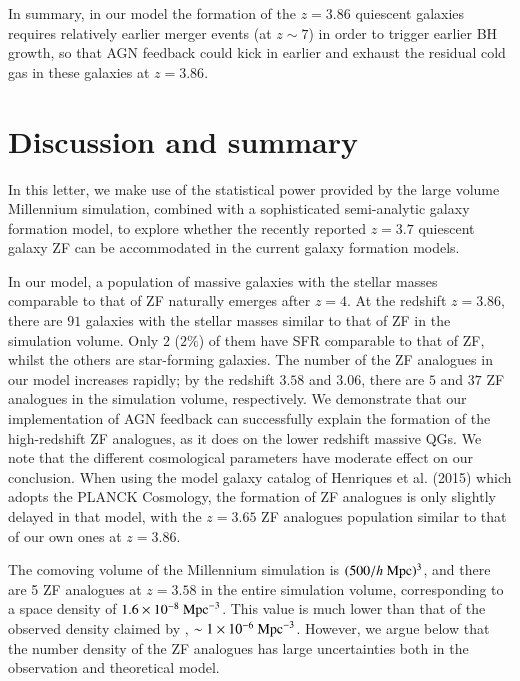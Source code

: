 \documentclass[useAMS,usenatbib]{mn2e}
\begin{document}
In summary, in our model the formation of the $z=3.86$ quiescent galaxies requires relatively earlier merger events (at $z\sim 7$) in order to trigger earlier BH growth, so that AGN feedback could kick in earlier and exhaust the residual cold gas in these galaxies at $z = 3.86$.

\section{Discussion and summary}

In this letter, we make use of the statistical power provided by the large volume Millennium simulation, combined with a sophisticated semi-analytic galaxy formation model, to explore whether the recently reported $z=3.7$ quiescent galaxy ZF can be accommodated in the current galaxy formation models. 

In our model, a population of massive galaxies with the stellar masses comparable to that of ZF naturally emerges after $z=4$. At the redshift $z=3.86$, there are $91$ galaxies with the stellar masses similar to that of ZF in the simulation volume. Only $2$ ($2\%$) of them have SFR comparable to that of ZF, whilst the others are star-forming galaxies. The number of the ZF analogues in our model increases rapidly; by the redshift $3.58$ and $3.06$, there are $5$ and $37$ ZF analogues in the simulation volume, respectively. We demonstrate that our implementation of AGN feedback can successfully explain the formation of the high-redshift ZF analogues, as it does on the lower redshift massive QGs. We note that the different cosmological parameters have moderate effect on our conclusion. When using the model galaxy catalog of Henriques et al. (2015) which adopts the PLANCK Cosmology, the formation of ZF analogues is only slightly delayed in that model, with the $z=3.65$ ZF analogues population similar to that of our own ones at $z=3.86$.

The comoving volume of the Millennium simulation is $(500/h~\rm{Mpc})^3$, and there are 5 ZF analogues at $z=3.58$ in the entire simulation volume, corresponding to a space density of $1.6\times 10^{-8}~\rm{Mpc}^{-3}$. This value is much lower than that of the observed density claimed by \cite{Straatman14}, $\sim 1\times 10^{-6}~\rm{Mpc}^{-3}$. However, we argue below that the number density of the ZF analogues has large uncertainties both in the observation and theoretical model.
\end{document}
